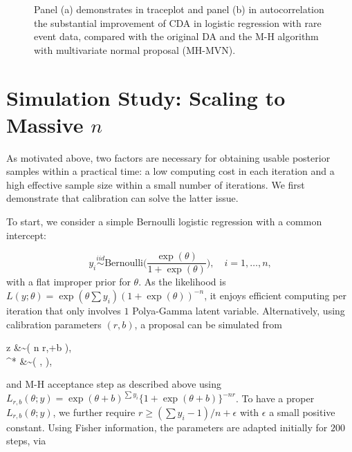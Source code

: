 \documentclass[11pt]{article}
\newcommand{\be}{\begin{equs}}
\newcommand{\ee}{\end{equs}}
\newcommand{\No}{\text{No}}
\newcommand{\PG}{\text{PG}}
\newcommand{\Bern}{\text{Bernoulli}}
\begin{document}
\begin{figure}[H]
  {%
    \qquad
  }
  {\caption{Panel (a) demonstrates in traceplot and panel (b) in autocorrelation the substantial improvement of CDA in logistic regression with rare event data, compared with the original DA \citep{polson2013bayesian} and the M-H algorithm with multivariate normal proposal (MH-MVN).\label{logit_random_mixing}}}
\end{figure}

{
\section{Simulation Study: Scaling to Massive $n$}
}

As motivated above,  two factors are necessary for obtaining usable posterior samples within a practical  time: a low computing cost  in each iteration and a high effective sample size within a small number of iterations. We first demonstrate that calibration can solve the latter issue.

To start, we consider a simple Bernoulli logistic regression with a common intercept:

$$y_i\stackrel{iid}{\sim} \Bern\Big(\frac{\exp(\theta)}{1+\exp(\theta)}\Big), \quad i=1,\ldots,n,$$
with a flat improper prior for $\theta$. As the likelihood is $L(y;\theta )= {\exp(\theta\sum y_i)}{(1+\exp(\theta))^{-n}} $, it enjoys efficient computing per iteration
that only involves $1$  Polya-Gamma latent variable. Alternatively, using calibration parameters $(r,b)$, a  proposal can be simulated from
\be
z &\sim \PG\left ( n r,\theta+b \right),\\
\theta^* &\sim \No \left( , \right),
\ee
and M-H acceptance step as described above using $L_{r,b}(\theta; y) = {\exp(\theta+b)^{\sum y_i}}{\{ 1+\exp(\theta+b)\}^{-nr}}$.
To have a proper $L_{r,b}(\theta;y)$, we further require $r \ge (\sum y_i-1)/n + \epsilon$ with $\epsilon$ a small positive constant. 
 Using Fisher information, the  parameters are adapted initially for $200$
 steps, via 
 
\end{document}
